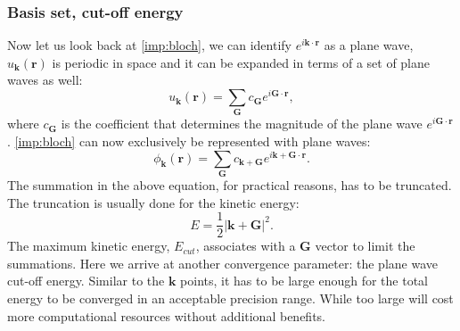 \subsubsection{Basis set, cut-off energy }
Now let us look back at \autoref{imp:bloch}, we can identify $e^{i\mathbf{k}\cdot\mathbf{r}}$ as a plane wave, $u_{\mathbf{k}}(\mathbf{r})$ is periodic in space and it can be expanded in terms of a set of plane waves as well:
\begin{equation}
u_{\mathbf{k}}(\mathbf{r})=\sum_{\mathbf{G}}c_{\mathbf{G}}e^{i\mathbf{G}\cdot\mathbf{r}},
\end{equation}
where $c_{\mathbf{G}}$ is the coefficient that determines the magnitude of the plane wave $e^{i\mathbf{G}\cdot\mathbf{r}}$. \autoref{imp:bloch} can now exclusively be represented with plane waves:
\begin{equation}
\phi_{\mathbf{k}}(\mathbf{r})=\sum_{\mathbf{G}}c_{\mathbf{k+G}}e^{i\mathbf{k+G}\cdot\mathbf{r}}.
\end{equation}
The summation in the above equation, for practical reasons, has to be truncated. The truncation is usually done for the kinetic energy:
\begin{equation}
E=\frac{1}{2}|\mathbf{k+G}|^2.
\end{equation}
The maximum kinetic energy, $E_{cut}$, associates with a $\mathbf{G}$ vector to limit the summations. Here we arrive at another convergence parameter: the plane wave cut-off energy. Similar to the $\mathbf{k}$ points, it has to be large enough for the total energy to be converged in an acceptable precision range.  While too large will cost more computational resources without additional benefits.
